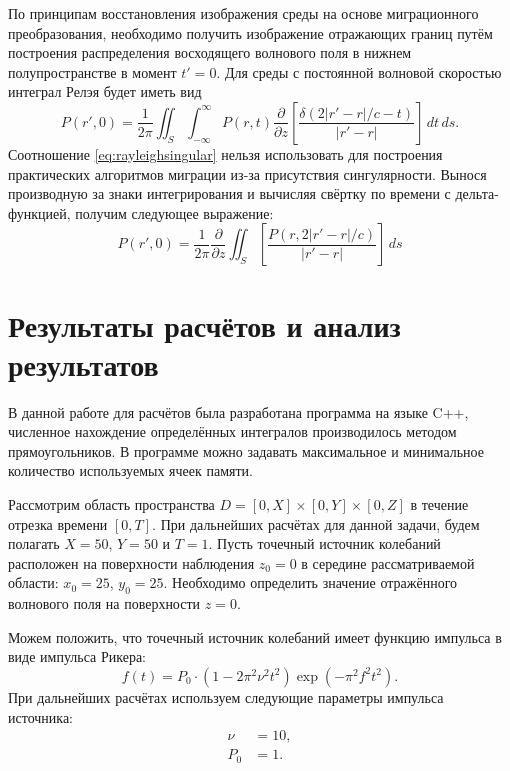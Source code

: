 \documentclass[a4paper, fontsize=14pt]{article}
\begin{document}
	По принципам восстановления изображения среды на основе миграционного преобразования, необходимо получить изображение отражающих границ путём построения распределения восходящего волнового поля в нижнем полупространстве в момент $t' = 0$. Для среды с постоянной волновой скоростью интеграл Релэя будет иметь вид
	\begin{equation}
		P(r',0) = \frac{1}{2\pi} \iint_S \int_{-\infty}^{\infty} P(r,t) \frac{\partial}{\partial z} 
		\left[ \frac{\delta(2|r'-r|/c -t)}{|r'-r|}\right]\,dt\,ds.
		\label{eq:rayleighsingular}
	\end{equation}
	Соотношение \eqref{eq:rayleighsingular} нельзя использовать для построения практических алгоритмов миграции из-за присутствия сингулярности. Вынося производную за знаки интегрирования и вычисляя свёртку по времени с дельта-функцией, получим следующее выражение\cite{golubev}:
	\begin{equation}
				P(r',0) = \frac{1}{2\pi}\frac{\partial}{\partial z} \iint_S   
		\left[ \frac{P(r,2|r'-r|/c)}{|r'-r|}\right]\,ds
		\label{eq:rayleighgood}
	\end{equation}

	\section{Результаты расчётов и анализ результатов}
	В данной работе для расчётов была разработана программа на языке C++, 
	численное нахождение определённых интегралов
	производилось методом прямоугольников. В программе можно задавать максимальное и минимальное количество используемых ячеек памяти.
	
	Рассмотрим область пространства $D = [0,X]\times [0,Y] \times [0,Z]$ в течение отрезка времени $[0,T]$. При дальнейших расчётах для данной задачи, будем полагать 
	$X = 50$, $Y=50$ и $T=1$. Пусть точечный источник колебаний расположен на поверхности наблюдения $z_0=0$ в середине рассматриваемой области: $x_0 = 25$, $y_0 = 25$. Необходимо определить значение отражённого волнового поля на поверхности $z=0$. 
	
	Можем положить, что точечный источник колебаний имеет функцию импульса в виде импульса Рикера:
	\begin{equation}
		f(t) = P_0 \cdot (1-2\pi^2 \nu^2 t^2)\exp(-\pi^2 f^2 t^2).
	\end{equation}
	При дальнейших расчётах используем следующие параметры импульса источника: 
	\begin{align*}
		\nu &=10, \\
		P_0 & = 1.
	\end{align*}
	
\end{document}

